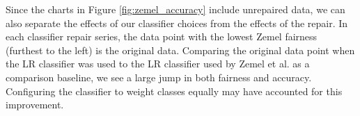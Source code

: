 Since the charts in Figure \ref{fig:zemel_accuracy} include unrepaired data, we can also separate the effects of our classifier choices from the effects of the repair.  In each classifier repair series, the data point with the lowest Zemel fairness (furthest to the left) is the original data.  Comparing the original data point when the LR classifier was used to the LR classifier used by Zemel et al. as a comparison baseline, we see a large jump in both fairness and accuracy.  Configuring the classifier to weight classes equally may have accounted for this improvement.



